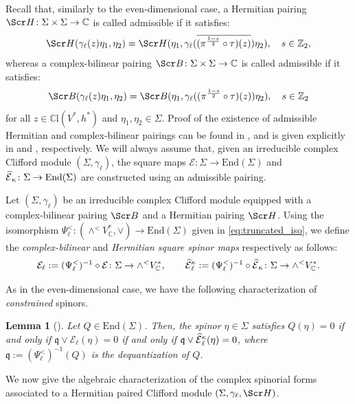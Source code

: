 \documentclass[10pt,a4paper,twoside,reqno]{amsart}
\theoremstyle{plain}
\newtheorem{lemma}[thm]{Lemma}
\theoremstyle{definition}
\theoremstyle{remark}
\newcommand{\End}{\mathrm{End}}
\def\C{\mathbb{C}}
\def\frq{\mathfrak{q}}
\def\scB{\Scr B}
\def\scS{\Scr H}
\def\cE{\mathcal{E}}
\def\hcE{\smash{\widehat{\mathcal{E}}}}
\def\mCl{\mathbb{C}\mathrm{l}}
\begin{document}
Recall that, similarly to the even-dimensional case, a Hermitian pairing $\scS\colon\Sigma\times\Sigma\to\C$ is called admissible if it satisfies: $$\scS(\gamma_\ell(z)\eta_1,\eta_2)=\scS(\eta_1,\gamma_\ell(\overline{(\pi^{\frac{1-s}{2}}\circ\tau)(z)})\eta_2),\quad s\in\mathbb{Z}_2,$$ whereas a complex-bilinear pairing $\scB\colon\Sigma\times\Sigma\to\C$ is called admissible if it satisfies: $$\scB(\gamma_\ell(z)\eta_1,\eta_2)=\scB(\eta_1,\gamma_\ell((\pi^{\frac{1-s}{2}}\circ\tau)(z))\eta_2),\quad s\in\mathbb{Z}_2$$ for all $z\in\mCl(V^*,h^*)$ and $\eta_1,\eta_2\in\Sigma$. Proof of the existence of admissible Hermitian and complex-bilinear pairings can be found in \cite{AC97,ACDVP05,HarveyBook,Mei13}, and is given explicitly in \cite[Prop.\ 4.3]{Algebraic_Complex_Square_2025} and \cite[Props.\ 4.8 and 4.11]{Algebraic_Complex_Square_2025}, respectively. We will always assume that, given an irreducible complex Clifford module $(\Sigma,\gamma_\ell)$, the square maps $\cE\colon\Sigma\to\End(\Sigma)$ and $\hcE_\kappa\colon\Sigma\to\End(\Sigma)$ are constructed using an admissible pairing.\medskip

Let $(\Sigma,\gamma_\ell)$ be an irreducible complex Clifford module equipped with a complex-bilinear pairing $\scB$ and a Hermitian pairing $\scS$. Using the isomorphism $\Psi^<_\ell\colon(\wedge^<V^*_\C,\vee)\to\End(\Sigma)$ given in \eqref{eq:truncated_iso}, we define the \emph{complex-bilinear} and \emph{Hermitian square spinor maps} respectively as follows: $$\cE_\ell:=(\Psi_\ell^<)^{-1}\circ\cE\colon\Sigma\to\wedge^<V^*_\C,\qquad\hcE^\kappa_\ell:=(\Psi_\ell^<)^{-1}\circ\hcE_\kappa\colon\Sigma\to\wedge^<V^*_\C.$$

As in the even-dimensional case, we have the following characterization of \emph{constrained} spinors.

\begin{lemma}[{\cite[Lemma 4.2]{Algebraic_Complex_Square_2025}}]\label{lemma:constrainedspinorodd}
    Let $Q\in \End(\Sigma)$. Then, the spinor $\eta\in \Sigma$ satisfies $Q(\eta) = 0$ if and only if $\frq\vee \cE_{\ell}(\eta) = 0$ if and only if $\frq\vee \hcE^{\kappa}_{\ell}(\eta) = 0$, where $\frq:=(\Psi_\ell^<)^{-1}(Q)$ is the \emph{dequantization} of $Q$.
\end{lemma}

We now give the algebraic characterization of the complex spinorial forms associated to a Hermitian paired Clifford module $(\Sigma,\gamma_\ell,\scS)$.
\end{document}
